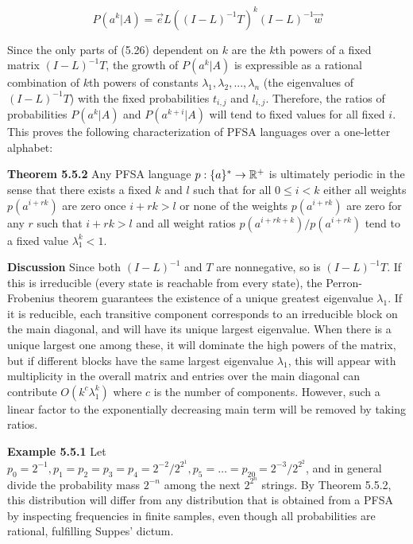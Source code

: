 \begin{equation}
P(a^k|A)= \vec{e}L((I-L)^{-1}T)^k(I-L)^{-1}\vec{w}
\end{equation}

\smallskip
\noindent
Since the only parts of (5.26) dependent on $k$ are the $k$th powers of a
fixed matrix $(I-L)^{-1}T$, the growth of $P(a^k|A)$ is expressible as a
rational combination of $k$th powers of constants $\lambda_1, \lambda_2, ...,
\lambda_n$ (the eigenvalues of $(I-L)^{-1}T$) with the fixed probabilities
$t_{i,j}$ and $l_{i,j}$. Therefore, the ratios of probabilities $P(a^k|A)$ and
$P(a^{k+i}|A)$ will tend to fixed values for all fixed $i$.  This proves 
the following characterization of PFSA languages over a one-letter alphabet:

\smallskip 
\noindent 
{\bf Theorem 5.5.2} Any PFSA language $p: \{a\}^* \rightarrow {\Bbb R}^+$ is
ultimately periodic in the sense that there exists a fixed $k$ and $l$ such
that for all $0 \leq i <k$ either all weights $p(a^{i+rk})$ are zero once
$i+rk >l$ or none of the weights $p(a^{i+rk})$ are zero for any $r$ such that
$i+rk >l$ and all weight ratios $p(a^{i+rk+k})/p(a^{i+rk})$ tend to a fixed
value $\lambda_1^k < 1$.

\smallskip 
\noindent 
{\bf Discussion} Since both $(I-L)^{-1}$ and $T$ are nonnegative, so is
$(I-L)^{-1}T$. If this is irreducible (every state is reachable from every
state), the Perron-Frobenius theorem guarantees the existence of a unique
greatest eigenvalue $\lambda_1$. If it is reducible, each transitive component
corresponds to an irreducible block on the main diagonal, and will have its
unique largest eigenvalue. When there is a unique largest one among these, it
will dominate the high powers of the matrix, but if different blocks have the
same largest eigenvalue $\lambda_1$, this will appear with multiplicity in the
overall matrix and entries over the main diagonal can contribute
$O(k^c\lambda_1^k)$ where $c$ is the number of components. However, such a
linear factor to the exponentially decreasing main term will be removed by
taking ratios.

\smallskip
\noindent 
{\bf Example 5.5.1} Let $p_0 = 2^{-1}, p_1 = p_2 = p_3 = p_4 = 2^{-2}/2^{2^1},
p_5 = \ldots = p_{20} = 2^{-3}/2^{2^2}$, and in general divide the probability
mass $2^{-n}$ among the next $2^{2^n}$ strings.  By Theorem 5.5.2, this
distribution will differ from any distribution that is obtained from a PFSA by
inspecting frequencies in finite samples, even though all probabilities are
rational, fulfilling Suppes' dictum.

